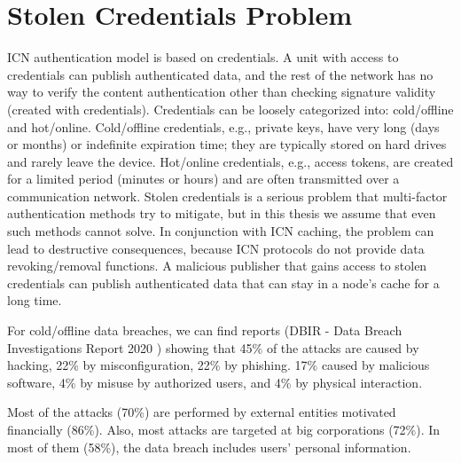 \chapter{Stolen Credentials Problem}
ICN authentication model is based on credentials. A unit with access to credentials can publish authenticated data, and the rest of the network has no way to verify the content authentication other than checking signature validity (created with credentials). Credentials can be loosely categorized into: cold/offline and hot/online. Cold/offline credentials, e.g., private keys, have very long (days or months) or indefinite expiration time; they are typically stored on hard drives and rarely leave the device. Hot/online credentials, e.g., access tokens, are created for a limited period (minutes or hours) and are often transmitted over a communication network. 
Stolen credentials is a serious problem that multi-factor authentication methods try to mitigate, but in this thesis we assume that even such methods cannot solve.
In conjunction with ICN caching, the problem can lead to destructive consequences, because ICN protocols do not provide data revoking/removal functions. A malicious publisher that gains access to stolen credentials can publish authenticated data that can stay in a node's cache for a long time. 

For cold/offline data breaches, we can find reports (DBIR - Data Breach Investigations Report 2020 \cite{2020Data0:online}) showing that 45\% of the attacks are caused by hacking, 22\% by misconfiguration, 22\% by phishing.  17\% caused by malicious software, 4\% by misuse by authorized users, and 4\% by physical interaction.

Most of the attacks (70\%) are performed by external entities motivated financially (86\%). Also, most attacks are targeted at big corporations (72\%). In most of them (58\%), the data breach includes users' personal information.  

